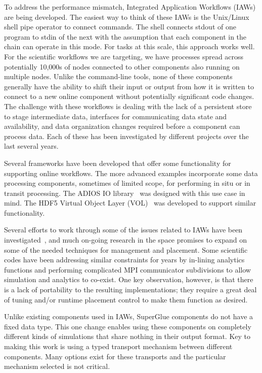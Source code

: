 \fi


To address the performance mismatch, Integrated Application Workflows (IAWs)
are being developed. The easiest way to think of these IAWs is the Unix/Linux
shell pipe operator to connect commands. The shell connects stdout of one
program to stdin of the next with the assumption that each component in the
chain can operate in this mode. For tasks at this scale, this approach works
well. For the scientific workflows we are targeting, we have processes spread
across potentially 10,000s of nodes connected to other components also running
on multiple nodes. Unlike the command-line tools, none of these components
generally have the ability to shift their input or output from how it is
written to connect to a new online component without potentially significant
code changes. The challenge with these workflows is dealing with the lack of a
persistent store to stage intermediate data, interfaces for communicating data
state and availability, and data organization changes required before a
component can process data.  Each of these has been investigated by different
projects over the last several years.

Several frameworks have been developed that offer some functionality for
supporting online workflows. The more advanced examples incorporate some data
processing components, sometimes of limited scope, for performing in situ or in
transit processing. The ADIOS IO library~\cite{lofstead:2009:adaptable} was designed with
this use case in mind. The HDF5 Virtual Object Layer
(VOL)~\cite{chaarawi:2013:hdf5-vol} was developed to support similar
functionality.

Several efforts to work through some of the issues related to IAWs have been
investigated~\cite{karimabadi:2013:catalyst,whitlock:2011:libsim,Glean,dayal:2014:flexpath,dreher:2016:bredala,zheng:2010:predata},
and much on-going research in the space promises to expand on some of the
needed techniques for management and placement.  Some
scientific codes have been addressing similar constraints for years by
in-lining analytics functions and performing complicated MPI communicator
subdivisions to allow simulation and analytics to co-exist.  One key
observation, however, is that there is a lack of portability to the resulting
implementations; they require a great deal of tuning and/or runtime placement
control to make them function as desired.
\fi


Unlike existing components used in IAWs, SuperGlue
components do not have a fixed data type. 
 This one change enables using these
components on completely different kinds of simulations that share nothing in
their output format. Key to making this work is using a typed transport
mechanism between different components. Many options exist for these transports
and the particular mechanism selected is not critical. 


